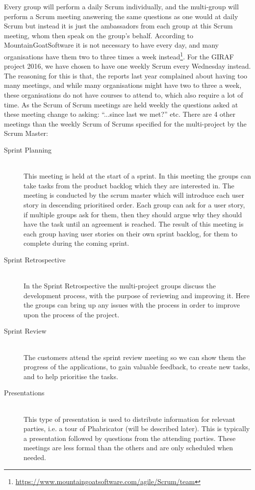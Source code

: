 Every group will perform a daily Scrum individually, and the multi-group will perform a Scrum meeting answering the same questions as one would at daily Scrum but instead it is just the ambassadors from each group at this Scrum meeting, whom then speak on the group's behalf.
According to MountainGoatSoftware it is not necessary to have every day, and many organisations have them two to three times a week instead\footnote{\url{https://www.mountaingoatsoftware.com/agile/Scrum/team}}.
For the GIRAF project 2016, we have chosen to have one weekly Scrum every Wednesday instead.
The reasoning for this is that, the reports last year complained about having too many meetings, and while many organisations might have two to three a week, these organisations do not have courses to attend to, which also require a lot of time.
As the Scrum of Scrum meetings are held weekly the questions asked at these meeting change to asking: ``...since last we met?'' etc.
There are 4 other meetings than the weekly Scrum of Scrums specified for the multi-project by the Scrum Master:

\begin{description}
	\item[Sprint Planning] \hfill \\
	This meeting is held at the start of a sprint. 
	In this meeting the groups can take tasks from the product backlog which they are interested in. 
	The meeting is conducted by the scrum master which will introduce each user story in descending prioritised order. 
	Each group can ask for a user story, if multiple groups ask for them, then they should argue why they should have the task until an agreement is reached. 
	The result of this meeting is each group having user stories on their own sprint backlog, for them to complete during the coming sprint. 
	\item[Sprint Retrospective] \hfill \\
	In the Sprint Retrospective the multi-project groups discuss the development process, with the purpose of reviewing and improving it. 
	Here the groups can bring up any issues with the process in order to improve upon the process of the project.
	\item[Sprint Review] \hfill \\
	The customers attend the sprint review meeting so we can show them the progress of the applications, to gain valuable feedback, to create new tasks, and to help prioritise the tasks. 
	\item[Presentations] \hfill \\
	This type of presentation is used to distribute information for relevant parties, i.e. a tour of Phabricator (will be described later). 
	This is typically a presentation followed by questions from the attending parties. 
	These meetings are less formal than the others and are only scheduled when needed.
\end{description}

